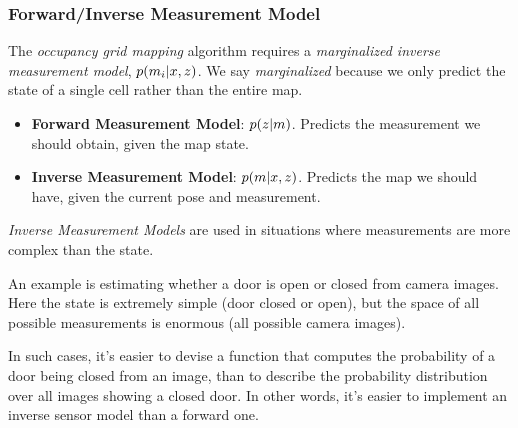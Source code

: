\begin{frame}
    \frametitle{Forward/Inverse Measurement Model}
    
    The \emph{occupancy grid mapping} algorithm requires a \emph{marginalized inverse measurement model}, $p(m_{i}|x, z)$. We say \emph{marginalized} because we only predict the state of a single cell rather than the entire map.

    \begin{itemize}
        \item \textbf{Forward Measurement Model}: $p(z | m)$. Predicts the measurement we should obtain, given the map state.
        \item \textbf{Inverse Measurement Model}: $p(m|x, z)$. Predicts the map we should have, given the current pose and measurement.
    \end{itemize}

    \emph{Inverse Measurement Models} are used in situations where measurements are more complex than the state.
        
    An example is estimating whether a door is open or closed from camera images. Here the state is extremely simple (door closed or open), but the space of all possible measurements is enormous (all possible camera images).
    
    In such cases, it's easier to devise a function that computes the probability of a door being closed from an image, than to describe the probability distribution over all images showing a closed door. In other words, it's easier to implement an inverse sensor model than a forward one.
    



\end{frame}
    

